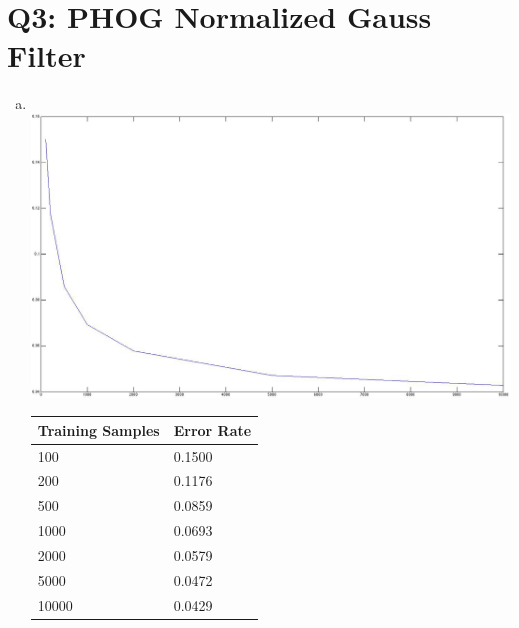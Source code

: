 \documentclass[12pt]{article}
\begin{document}
\section*{Q3: PHOG Normalized Gauss Filter}
  \begin{enumerate}[d.]
    \item \quad \\
      \includegraphics[scale=0.35]{q3_normalized_gauss.jpg}
      \begin{tabular}{l|l}
        \hline
        Training Samples & Error Rate \\
        \hline
        100   & 0.1500 \\
        200   & 0.1176 \\
        500   & 0.0859 \\
        1000  & 0.0693 \\
        2000  & 0.0579 \\
        5000  & 0.0472 \\
        10000 & 0.0429 \\
      \end{tabular}
  \end{enumerate}

\newpage
\end{document}
